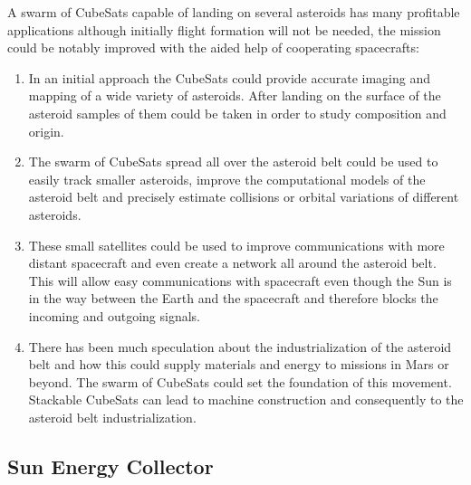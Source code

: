 A swarm of CubeSats capable of landing on several asteroids has many
profitable applications although initially flight formation will not
be needed, the mission could be notably improved with the aided help
of cooperating spacecrafts:
\begin{enumerate}
\item In an initial approach the CubeSats could provide accurate imaging
and mapping of a wide variety of asteroids. After landing on the surface
of the asteroid samples of them could be taken in order to study composition
and origin.
\item The swarm of CubeSats spread all over the asteroid belt could be used
to easily track smaller asteroids, improve the computational models
of the asteroid belt and precisely estimate collisions or orbital
variations of different asteroids.
\item These small satellites could be used to improve communications with
more distant spacecraft and even create a network all around the asteroid
belt. This will allow easy communications with spacecraft even though
the Sun is in the way between the Earth and the spacecraft and therefore
blocks the incoming and outgoing signals.
\item There has been much speculation about the industrialization of the
asteroid belt and how this could supply materials and energy to missions
in Mars or beyond. The swarm of CubeSats could set the foundation
of this movement. Stackable CubeSats can lead to machine construction
and consequently to the asteroid belt industrialization.
\end{enumerate}

\subsection{Sun Energy Collector}


